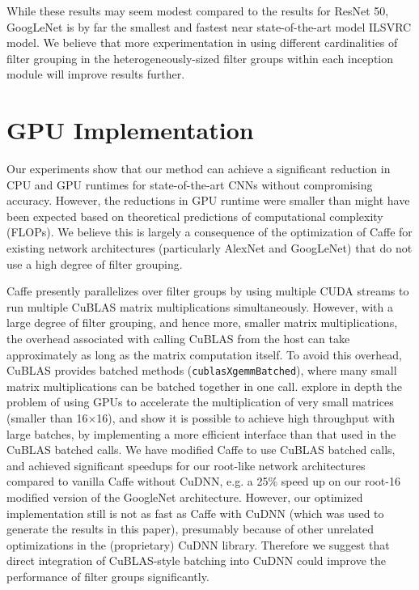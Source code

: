 \documentclass[thesis]{subfiles}
\begin{document}
	While these results may seem modest compared to the results for ResNet 50, GoogLeNet is by far the smallest and fastest near state-of-the-art model ILSVRC model. We believe that more experimentation in using different cardinalities of filter grouping in the heterogeneously-sized filter groups within each inception module will improve results further.
	
	\section{GPU Implementation}
	\label{gpuexplanation}
	Our experiments show that our method can achieve a significant reduction in CPU and GPU runtimes for state-of-the-art CNNs without compromising accuracy. However, the reductions in GPU runtime were smaller than might have been expected based on theoretical predictions of computational complexity (FLOPs). We believe this is largely a consequence of the optimization of Caffe for existing network architectures (particularly AlexNet and GoogLeNet) that do not use a high degree of filter grouping. %
	
	Caffe presently parallelizes over filter groups by using multiple CUDA streams to run multiple CuBLAS matrix multiplications simultaneously. However, with a large degree of filter grouping, and hence more, smaller matrix multiplications, the overhead associated with calling CuBLAS from the host can take approximately as long as the matrix computation itself. To avoid this overhead, CuBLAS provides batched methods (\eg \texttt{cublasXgemmBatched}), where many small matrix multiplications can be batched together in one call. \citet{jhurani2015gemm} explore in depth the problem of using GPUs to accelerate the multiplication of very small matrices (smaller than 16$\times$16), and show it is possible to achieve high throughput with large batches, by implementing a more efficient interface than that used in the CuBLAS batched calls.
	We have modified Caffe to use CuBLAS batched calls, and achieved significant speedups for our  root-like network architectures compared to vanilla Caffe without CuDNN, e.g. a 25\% speed up on our root-16 modified version of the GoogleNet architecture. However, our optimized implementation still is not as fast as Caffe with CuDNN (which was used to generate the results in this paper), presumably because of other unrelated optimizations in the (proprietary) CuDNN library. Therefore we suggest that direct integration of CuBLAS-style batching into CuDNN could improve the performance of filter groups significantly.
	
\end{document}
